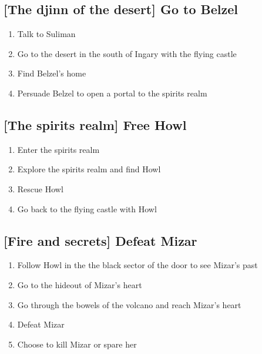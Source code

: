 \subsection{[The djinn of the desert] Go to Belzel}
\begin{enumerate}
\item Talk to Suliman
\item Go to the desert in the south of Ingary with the flying castle
\item Find Belzel's home
\item Persuade Belzel to open a portal to the spirits realm
\end{enumerate}

\subsection{[The spirits realm] Free Howl}
\begin{enumerate}
\item Enter the spirits realm
\item Explore the spirits realm and find Howl
\item Rescue Howl
\item Go back to the flying castle with Howl
\end{enumerate}

\subsection{[Fire and secrets] Defeat Mizar}
\begin{enumerate}
\item Follow Howl in the the black sector of the door to see Mizar's past
\item Go to the hideout of Mizar's heart
\item Go through the bowels of the volcano and reach Mizar's heart
\item Defeat Mizar
\item Choose to kill Mizar or spare her
\end{enumerate}
